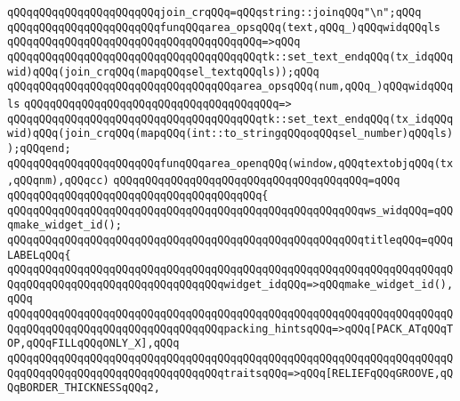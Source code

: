 \newline
\newline
\verb|qQQqqQQqqQQqqQQqqQQqqQQqjoin_crqQQq=qQQqstring::joinqQQq"\n";qQQq|\newline
\newline
\verb|qQQqqQQqqQQqqQQqqQQqqQQqfunqQQqarea_opsqQQq(text,qQQq_)qQQqwidqQQqls|\newline
\verb|qQQqqQQqqQQqqQQqqQQqqQQqqQQqqQQqqQQqqQQq=>qQQq|\newline
\verb|qQQqqQQqqQQqqQQqqQQqqQQqqQQqqQQqqQQqqQQqtk::set_text_endqQQq(tx_idqQQqwid)qQQq(join_crqQQq(mapqQQqsel_textqQQqls));qQQq|\newline
\newline
\verb|qQQqqQQqqQQqqQQqqQQqqQQqqQQqqQQqqQQqarea_opsqQQq(num,qQQq_)qQQqwidqQQqls|\newline
\verb|qQQqqQQqqQQqqQQqqQQqqQQqqQQqqQQqqQQqqQQq=>|\newline
\verb|qQQqqQQqqQQqqQQqqQQqqQQqqQQqqQQqqQQqqQQqtk::set_text_endqQQq(tx_idqQQqwid)qQQq(join_crqQQq(mapqQQq(int::to_stringqQQqoqQQqsel_number)qQQqls));qQQqend;|\newline
\newline
\newline
\newline
\verb|qQQqqQQqqQQqqQQqqQQqqQQqfunqQQqarea_openqQQq(window,qQQqtextobjqQQq(tx,qQQqnm),qQQqcc)|\newline
\verb|qQQqqQQqqQQqqQQqqQQqqQQqqQQqqQQqqQQqqQQq=qQQq|\newline
\verb|qQQqqQQqqQQqqQQqqQQqqQQqqQQqqQQqqQQqqQQq{|\newline
\verb|qQQqqQQqqQQqqQQqqQQqqQQqqQQqqQQqqQQqqQQqqQQqqQQqqQQqqQQqws_widqQQq=qQQqmake_widget_id();|\newline
\newline
\verb|qQQqqQQqqQQqqQQqqQQqqQQqqQQqqQQqqQQqqQQqqQQqqQQqqQQqqQQqtitleqQQq=qQQqLABELqQQq{|\newline
\verb|qQQqqQQqqQQqqQQqqQQqqQQqqQQqqQQqqQQqqQQqqQQqqQQqqQQqqQQqqQQqqQQqqQQqqQQqqQQqqQQqqQQqqQQqqQQqqQQqqQQqqQQqwidget_idqQQq=>qQQqmake_widget_id(),qQQq|\newline
\verb|qQQqqQQqqQQqqQQqqQQqqQQqqQQqqQQqqQQqqQQqqQQqqQQqqQQqqQQqqQQqqQQqqQQqqQQqqQQqqQQqqQQqqQQqqQQqqQQqqQQqqQQqpacking_hintsqQQq=>qQQq[PACK_ATqQQqTOP,qQQqFILLqQQqONLY_X],qQQq|\newline
\verb|qQQqqQQqqQQqqQQqqQQqqQQqqQQqqQQqqQQqqQQqqQQqqQQqqQQqqQQqqQQqqQQqqQQqqQQqqQQqqQQqqQQqqQQqqQQqqQQqqQQqqQQqtraitsqQQq=>qQQq[RELIEFqQQqGROOVE,qQQqBORDER_THICKNESSqQQq2,|\newline
